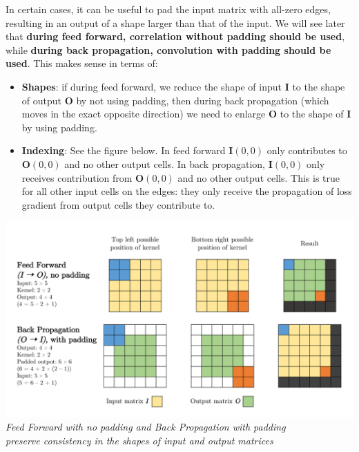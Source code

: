 \documentclass[12pt]{article}
\begin{document}
In certain cases, it can be useful to pad the input matrix with all-zero edges, resulting in an output of a shape larger than that of the input. We will see later that \textbf{during feed forward, correlation without padding should be used}, while \textbf{during back propagation, convolution with padding should be used}. This makes sense in terms of:
\begin{itemize}
    \item \textbf{Shapes}: if during feed forward, we reduce the shape of input $\bm{I}$ to the shape of output $\bm{O}$ by not using padding, then during back propagation (which moves in the exact opposite direction) we need to enlarge $\bm{O}$ to the shape of $\bm{I}$ by using padding.
    \item \textbf{Indexing}: See the figure below. In feed forward $\bm{I}(0, 0)$ only contributes to $\bm{O}(0, 0)$ and no other output cells. In back propagation, $\bm{I}(0, 0)$ only receives contribution from $\bm{O}(0, 0)$ and no other output cells. This is true for all other input cells on the edges: they only receive the propagation of loss gradient from output cells they contribute to.
\end{itemize}
\begin{center}
\includegraphics[width=\textwidth]{padding.png}
\textit{Feed Forward with no padding and Back Propagation with padding\\ preserve consistency in the shapes of input and output matrices}
\end{center}
\end{document}
